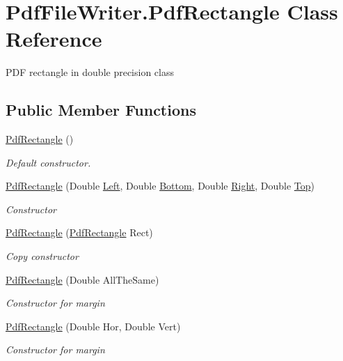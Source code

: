 \hypertarget{class_pdf_file_writer_1_1_pdf_rectangle}{}\section{Pdf\+File\+Writer.\+Pdf\+Rectangle Class Reference}
\label{class_pdf_file_writer_1_1_pdf_rectangle}


P\+DF rectangle in double precision class  


\subsection*{Public Member Functions}
\begin{DoxyCompactItemize}
\item 
\hyperlink{class_pdf_file_writer_1_1_pdf_rectangle_a2661fa40bc1e74eb7ccff558837409c6}{Pdf\+Rectangle} ()
\begin{DoxyCompactList}\small\item\em Default constructor. \end{DoxyCompactList}\item 
\hyperlink{class_pdf_file_writer_1_1_pdf_rectangle_a2e0633f7455ffb34e5612633065ae552}{Pdf\+Rectangle} (Double \hyperlink{class_pdf_file_writer_1_1_pdf_rectangle_ab9bdc68f02bdfab49439b04e597bdf97}{Left}, Double \hyperlink{class_pdf_file_writer_1_1_pdf_rectangle_a87bb8dca49ad7a4bedd4f449a5e56db1}{Bottom}, Double \hyperlink{class_pdf_file_writer_1_1_pdf_rectangle_ae0d410f44d87053e0125255b4e139fcb}{Right}, Double \hyperlink{class_pdf_file_writer_1_1_pdf_rectangle_a6f32d2a09f4e0bb8168a4633fb585ff9}{Top})
\begin{DoxyCompactList}\small\item\em Constructor \end{DoxyCompactList}\item 
\hyperlink{class_pdf_file_writer_1_1_pdf_rectangle_ae95e7f178ca0b45f8572652295133611}{Pdf\+Rectangle} (\hyperlink{class_pdf_file_writer_1_1_pdf_rectangle}{Pdf\+Rectangle} Rect)
\begin{DoxyCompactList}\small\item\em Copy constructor \end{DoxyCompactList}\item 
\hyperlink{class_pdf_file_writer_1_1_pdf_rectangle_aaa35026ffe659eb8238f2db1de08356f}{Pdf\+Rectangle} (Double All\+The\+Same)
\begin{DoxyCompactList}\small\item\em Constructor for margin \end{DoxyCompactList}\item 
\hyperlink{class_pdf_file_writer_1_1_pdf_rectangle_af1a79d86a2f0a904e48c256d27d897ae}{Pdf\+Rectangle} (Double Hor, Double Vert)
\begin{DoxyCompactList}\small\item\em Constructor for margin \end{DoxyCompactList}\end{DoxyCompactItemize}
